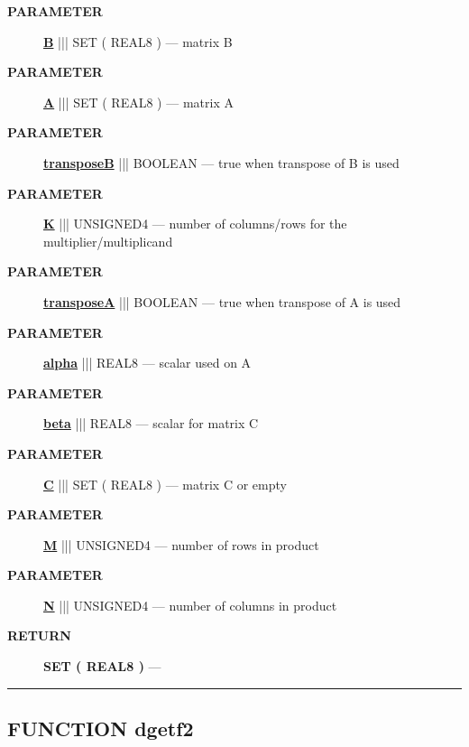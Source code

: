 \par
\begin{description}
\item [\colorbox{tagtype}{\color{white} \textbf{\textsf{PARAMETER}}}] \textbf{\underline{B}} ||| SET ( REAL8 ) --- matrix B
\item [\colorbox{tagtype}{\color{white} \textbf{\textsf{PARAMETER}}}] \textbf{\underline{A}} ||| SET ( REAL8 ) --- matrix A
\item [\colorbox{tagtype}{\color{white} \textbf{\textsf{PARAMETER}}}] \textbf{\underline{transposeB}} ||| BOOLEAN --- true when transpose of B is used
\item [\colorbox{tagtype}{\color{white} \textbf{\textsf{PARAMETER}}}] \textbf{\underline{K}} ||| UNSIGNED4 --- number of columns/rows for the multiplier/multiplicand
\item [\colorbox{tagtype}{\color{white} \textbf{\textsf{PARAMETER}}}] \textbf{\underline{transposeA}} ||| BOOLEAN --- true when transpose of A is used
\item [\colorbox{tagtype}{\color{white} \textbf{\textsf{PARAMETER}}}] \textbf{\underline{alpha}} ||| REAL8 --- scalar used on A
\item [\colorbox{tagtype}{\color{white} \textbf{\textsf{PARAMETER}}}] \textbf{\underline{beta}} ||| REAL8 --- scalar for matrix C
\item [\colorbox{tagtype}{\color{white} \textbf{\textsf{PARAMETER}}}] \textbf{\underline{C}} ||| SET ( REAL8 ) --- matrix C or empty
\item [\colorbox{tagtype}{\color{white} \textbf{\textsf{PARAMETER}}}] \textbf{\underline{M}} ||| UNSIGNED4 --- number of rows in product
\item [\colorbox{tagtype}{\color{white} \textbf{\textsf{PARAMETER}}}] \textbf{\underline{N}} ||| UNSIGNED4 --- number of columns in product
\end{description}







\par
\begin{description}
\item [\colorbox{tagtype}{\color{white} \textbf{\textsf{RETURN}}}] \textbf{SET ( REAL8 )} --- 
\end{description}




\rule{\linewidth}{0.5pt}
\subsection*{\textsf{\colorbox{headtoc}{\color{white} FUNCTION}
dgetf2}}

